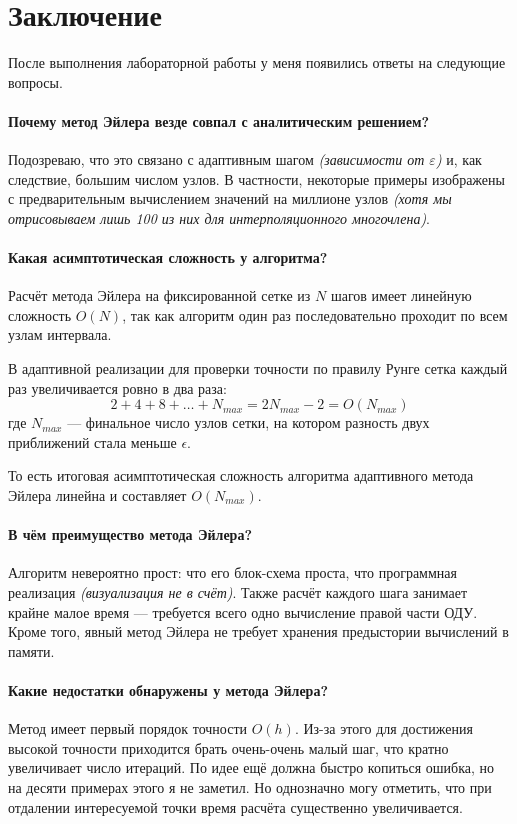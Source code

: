 \section{Заключение}

После выполнения лабораторной работы у меня появились ответы на следующие вопросы.

\paragraph{Почему метод Эйлера везде совпал с аналитическим решением?} Подозреваю, что это связано с адаптивным шагом \textit{(зависимости от \( \varepsilon \))} и, как следствие, большим числом узлов. В частности, некоторые примеры изображены с предварительным вычислением значений на миллионе узлов \textit{(хотя мы отрисовываем лишь 100 из них для интерполяционного многочлена)}. 

\paragraph{Какая асимптотическая сложность у алгоритма?} 
Расчёт метода Эйлера на фиксированной сетке из $N$ шагов имеет линейную сложность $O(N)$, так как алгоритм один раз последовательно проходит по всем узлам интервала.

В адаптивной реализации для проверки точности по правилу Рунге сетка каждый раз увеличивается ровно в два раза:
\[
2 + 4 + 8 + \dots + N_{max} = 2N_{max} - 2 = O(N_{max})
\]
где $N_{max}$ — финальное число узлов сетки, на котором разность двух приближений стала меньше $\epsilon$.

То есть итоговая асимптотическая сложность алгоритма адаптивного метода Эйлера линейна и составляет $O(N_{max})$.

\paragraph{В чём преимущество метода Эйлера?} 

Алгоритм невероятно прост: что его блок-схема проста, что программная реализация \textit{(визуализация не в счёт)}. Также расчёт каждого шага занимает крайне малое время --- требуется всего одно вычисление правой части ОДУ. Кроме того, явный метод Эйлера не требует хранения предыстории вычислений в памяти.

\paragraph{Какие недостатки обнаружены у метода Эйлера?} 
Метод имеет первый порядок точности $O(h)$. Из-за этого для достижения высокой точности приходится брать очень-очень малый шаг, что кратно увеличивает число итераций. По идее ещё должна быстро копиться ошибка, но на десяти примерах этого я не заметил. Но однозначно могу отметить, что при отдалении интересуемой точки время расчёта существенно увеличивается.


